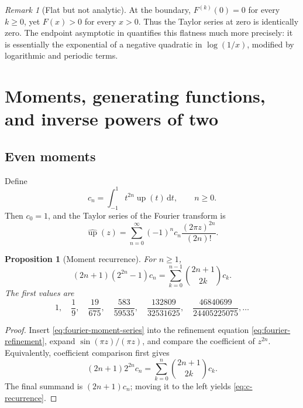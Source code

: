 \documentclass[11pt]{article}
\numberwithin{equation}{section}
\newtheorem{proposition}[theorem]{Proposition}
\theoremstyle{definition}
\theoremstyle{remark}
\newtheorem{remark}[theorem]{Remark}
\newcommand{\dd}{\,\mathrm{d}}
\newcommand{\upf}{\operatorname{up}}
\begin{document}
\begin{remark}[Flat but not analytic]
At the boundary, $F^{(k)}(0)=0$ for every $k\ge0$, yet $F(x)>0$ for every
$x>0$.  Thus the Taylor series at zero is identically zero.  The endpoint
asymptotic in  quantifies this flatness much more
precisely: it is essentially the exponential of a negative quadratic in
$\log(1/x)$, modified by logarithmic and periodic terms.
\end{remark}

\section{Moments, generating functions, and inverse powers of two}
\label{sec:moments}

\subsection{Even moments}

Define
\begin{equation}\label{eq:c-def}
 c_n=\int_{-1}^{1}t^{2n}\upf(t)\dd t,
 \qquad n\ge0.
\end{equation}
Then $c_0=1$, and the Taylor series of the Fourier transform is
\begin{equation}\label{eq:fourier-moment-series}
 \widehat{\upf}(z)=
 \sum_{n=0}^{\infty}(-1)^n c_n\frac{(2\pi z)^{2n}}{(2n)!}.
\end{equation}

\begin{proposition}[Moment recurrence]\label{prop:c-recurrence}
For $n\ge1$,
\begin{equation}\label{eq:c-recurrence}
 (2n+1)(2^{2n}-1)c_n
 =\sum_{k=0}^{n-1}\binom{2n+1}{2k}c_k.
\end{equation}
The first values are
\begin{equation}\label{eq:c-first}
 1,\quad \frac19,\quad \frac{19}{675},\quad
 \frac{583}{59535},\quad
 \frac{132809}{32531625},\quad
 \frac{46840699}{24405225075},\ldots
\end{equation}
\end{proposition}

\begin{proof}
Insert \eqref{eq:fourier-moment-series} into the refinement equation
\eqref{eq:fourier-refinement}, expand
$\sin(\pi z)/(\pi z)$, and compare the coefficient of $z^{2n}$.  Equivalently,
coefficient comparison first gives
\[
 (2n+1)2^{2n}c_n
 =\sum_{k=0}^{n}\binom{2n+1}{2k}c_k.
\]
The final summand is $(2n+1)c_n$; moving it to the left yields
\eqref{eq:c-recurrence}.
\end{proof}
\end{document}
